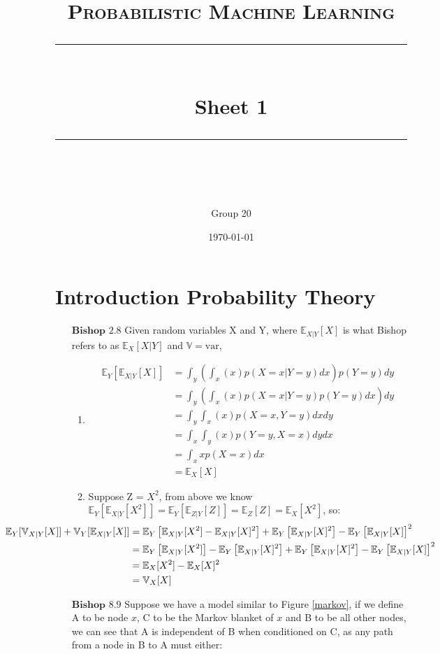 \documentclass[11pt]{article} %
\title{	
    \vspace*{-1.5cm}
	\normalfont\normalsize
	\textsc{Probabilistic Machine Learning}\\ %
	\vspace{3pt}
	\rule{\linewidth}{0.5pt}\\ %
	\vspace{14pt}
	{\huge Sheet 1}\\ %
	\vspace{4pt}
	\rule{\linewidth}{2pt}\\ %
	\vspace{4pt}
}
\author{Group 20
}
\date{\normalsize\today}  %
\begin{document}
\maketitle %
\section{Introduction Probability Theory}
\begin{enumerate}
% 

\item[$\textbf{Bishop }2.8$] Given random variables X and Y, where 
	$\mathbb{E}_{X|Y}[X]$ is what Bishop refers to as $\mathbb{E}_X[X|Y]$ and 
	$\mathbb{V}=\textrm{var}$,
\begin{enumerate}
	\item \begin{align*}
		\mathbb{E}_Y[\mathbb{E}_{X|Y}[X]]
		&= \int_y\left(\int_x(x)p(X=x|Y=y)dx\right)p(Y=y)dy \\
		&= \int_y\left(\int_x(x)p(X=x|Y=y)p(Y=y)dx\right)dy \\
		&= \int_y\int_x(x)p(X=x,Y=y)dxdy \\
		&= \int_x\int_y(x)p(Y=y, X=x)dydx \\
		&= \int_xxp(X=x)dx \\
		&= \mathbb{E}_X[X]
	\end{align*}
	\item Suppose Z = $X^2$, from above we know \\
	$\mathbb{E}_Y[\mathbb{E}_{X|Y}[X^2]]=\mathbb{E}_Y[\mathbb{E}_{Z|Y}[Z]]=\mathbb{E}_Z[Z]=\mathbb{E}_X[X^2]$, so:\\
\begin{align*}\hspace{-3cm}
	\mathbb{E}_Y[\mathbb{V}_{X|Y}[X]] + \mathbb{V}_{Y}[\mathbb{E}_{X|Y}[X]]
    &= \mathbb{E}_Y\left[\mathbb{E}_{X|Y}[X^2] - \mathbb{E}_{X|Y}[X]^2\right] 
    + \mathbb{E}_{Y}\left[\mathbb{E}_{X|Y}[X]^2\right]-\mathbb{E}_{Y}\left[\mathbb{E}_{X|Y}[X]\right]^2\\
    &= \mathbb{E}_Y\left[\mathbb{E}_{X|Y}[X^2]\right] - \mathbb{E}_Y\left[\mathbb{E}_{X|Y}[X]^2\right] 
    + \mathbb{E}_{Y}\left[\mathbb{E}_{X|Y}[X]^2\right]-\mathbb{E}_{Y}\left[\mathbb{E}_{X|Y}[X]\right]^2\\
    &= \mathbb{E}_X[X^2] - \mathbb{E}_{X}[X]^2\\
    &= \mathbb{V}_X[X]
	\end{align*}
\end{enumerate}
\newpage
\item[$\textbf{Bishop }8.9$] Suppose we have a model similar to Figure \ref{markov}, if we define A to be node $x$, C to be the Markov blanket of $x$ and B to be all other nodes, we can see that A is independent of B when conditioned on C, as any path from a node in B to A must either: \begin{enumerate}

\end{enumerate}
\end{enumerate}
\end{document}
